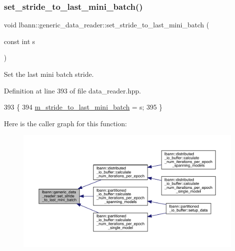 \subsubsection{\texorpdfstring{set\+\_\+stride\+\_\+to\+\_\+last\+\_\+mini\+\_\+batch()}{set\_stride\_to\_last\_mini\_batch()}}
{\footnotesize\ttfamily void lbann\+::generic\+\_\+data\+\_\+reader\+::set\+\_\+stride\+\_\+to\+\_\+last\+\_\+mini\+\_\+batch (\begin{DoxyParamCaption}\item[{const int}]{s }\end{DoxyParamCaption})\hspace{0.3cm}{\ttfamily [inline]}}



Set the last mini batch stride. 



Definition at line 393 of file data\+\_\+reader.\+hpp.


\begin{DoxyCode}
393                                                   \{
394     \hyperlink{classlbann_1_1generic__data__reader_ac46922f2ef4f392bcc7c59c21685a3ff}{m\_stride\_to\_last\_mini\_batch} = s;
395   \}
\end{DoxyCode}
Here is the caller graph for this function\+:\nopagebreak
\begin{figure}[H]
\begin{center}
\leavevmode
\includegraphics[width=350pt]{classlbann_1_1generic__data__reader_af2fc6b35ad8139d15729b19db2895827_icgraph}
\end{center}
\end{figure}
\mbox{\label{classlbann_1_1generic__data__reader_add5bd1d488967ebab5852b636e07db15}} 
